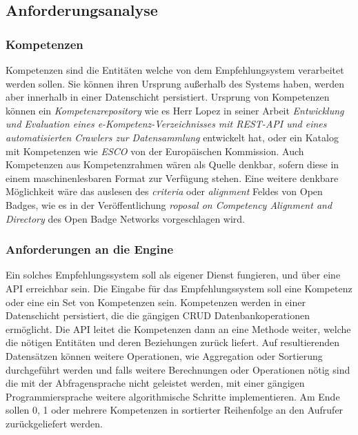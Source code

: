 \subsection{Anforderungsanalyse} 

\subsubsection{Kompetenzen}

Kompetenzen sind die Entitäten welche von dem Empfehlungsystem verarbeitet werden sollen. Sie können ihren Ursprung außerhalb des Systems haben, werden aber innerhalb in einer Datenschicht persistiert. Ursprung von Kompetenzen können ein \textit{Kompetenzrepository} wie es Herr Lopez in seiner Arbeit \textit{Entwicklung und Evaluation eines e-Kompetenz-Verzeichnisses mit REST-API und eines automatisierten Crawlers zur Datensammlung}\cite{lopez} entwickelt hat, oder ein Katalog mit Kompetenzen wie \textit{ESCO} von der Europäischen Kommission. Auch Kompetenzen aus Kompetenzrahmen wären als Quelle denkbar, sofern diese in einem maschinenlesbaren Format zur Verfügung stehen. Eine weitere denkbare Möglichkeit wäre das auslesen des \textit{criteria} oder \textit{alignment} Feldes von Open Badges, wie es in der Veröffentlichung \textit{roposal on Competency Alignment and Directory} \cite{OBNO3-A2} des Open Badge Networks vorgeschlagen wird.

\subsubsection{Anforderungen an die Engine}
Ein solches Empfehlungssystem soll als eigener Dienst fungieren, und über eine API erreichbar sein. Die Eingabe für das Empfehlungssystem soll eine Kompetenz oder eine ein Set von Kompetenzen sein. Kompetenzen werden in einer Datenschicht persistiert, die die gängigen CRUD Datenbankoperationen ermöglicht. Die API leitet die Kompetenzen dann an eine Methode weiter, welche die nötigen Entitäten und deren Beziehungen zurück liefert. Auf resultierenden Datensätzen können weitere Operationen, wie Aggregation oder Sortierung durchgeführt werden und falls weitere Berechnungen oder Operationen nötig sind die mit der Abfragensprache nicht geleistet werden, mit einer gängigen Programmiersprache weitere algorithmische Schritte implementieren. Am Ende sollen 0, 1 oder mehrere Kompetenzen in sortierter Reihenfolge an den Aufrufer zurückgeliefert werden.
\newline

